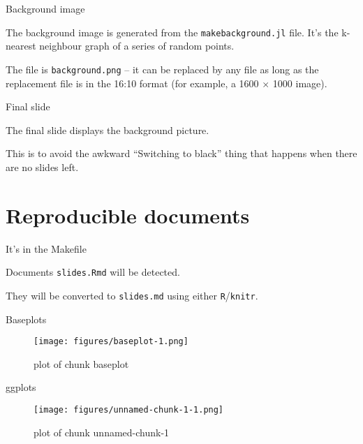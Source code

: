 \documentclass[11pt, compress, aspectratio=1610]{beamer}
\let\OldTexttt\texttt
\renewcommand{\texttt}[1]{\OldTexttt{\color{plTT}#1}}
\begin{document}
\begin{frame}[fragile]{Background image}

The background image is generated from the \texttt{makebackground.jl}
file. It's the k-nearest neighbour graph of a series of random points.

The file is \texttt{background.png} -- it can be replaced by any file
\alert{as long
as} the replacement file is in the 16:10 format (for example, a 1600
\(\times\) 1000 image).

\end{frame}

\begin{frame}{Final slide}

The final slide displays the background picture.

This is to avoid the awkward ``Switching to black'' thing that happens
when there are no slides left.

\end{frame}

\section{Reproducible documents}\label{reproducible-documents}

\begin{frame}[fragile]{It's in the Makefile}

Documents \texttt{slides.Rmd} will be detected.

They will be converted to \texttt{slides.md} using either
\texttt{R}/\texttt{knitr}.

\end{frame}

\begin{frame}{Baseplots}

\begin{figure}
\centering
\texttt{[image: figures/baseplot-1.png]}
\caption{plot of chunk baseplot}
\end{figure}

\end{frame}

\begin{frame}{ggplots}

\begin{figure}
\centering
\texttt{[image: figures/unnamed-chunk-1-1.png]}
\caption{plot of chunk unnamed-chunk-1}
\end{figure}

\end{frame}
\end{document}
